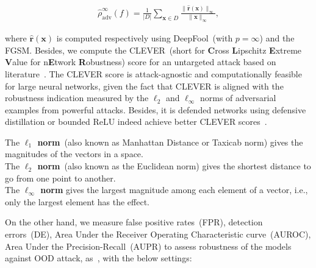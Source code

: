 \vspace{-4mm}
\begin{align}
    \hat{\rho}_{\mathrm{adv}}^{\infty}(f)=\frac{1}{|D|} \sum_{\boldsymbol{x} \in D} \frac{\|\hat{\boldsymbol{r}}(\boldsymbol{x})\|
    _{\infty}}{\|\boldsymbol{x}\|_{\infty}},
\end{align}

where $\hat{\boldsymbol{r}}(\boldsymbol{x})$ is
computed respectively using DeepFool~(with $p=\infty$) and the FGSM. Besides, we compute the CLEVER~(short for \textbf{C}ross \textbf{L}ipschitz \textbf{E}xtreme \textbf{V}alue for n\textbf{E}twork \textbf{R}obustness) score for an untargeted attack based on literature~\cite{weng2018evaluating}. 
The CLEVER score is attack-agnostic and computationally feasible for large neural networks, given the fact that CLEVER is aligned with the robustness indication measured by the $\ell_{2}$ and $\ell_{\infty}$ norms of adversarial examples from powerful attacks. 
Besides, it is defended networks using defensive distillation or bounded ReLU indeed achieve better CLEVER scores~\cite{weng2018evaluating}. 

\vspace{2mm}
\begin{tcolorbox}[colback=white!3!white,colframe=gray!120!black,title=\faBook~$\ell_{2}$ vs. $\ell_{2}$ vs. $\ell_{\infty}$ norms]
    \scriptsize{
        The \textbf{$\ell_{1}$ norm}~(also known as Manhattan Distance or Taxicab norm) gives the magnitudes of the vectors in a space. \\
        The \textbf{$\ell_{2}$ norm}~(also known as the Euclidean norm) gives the shortest distance to go from one point to another. \\
        The \textbf{$\ell_{\infty}$ norm} gives the largest magnitude among each element of a vector, i.e., only the largest element has the effect. 
        }
\end{tcolorbox}

\hspace*{3.5mm} On the other hand, we measure false positive rates~(FPR), detection errors~(DE), Area Under the Receiver Operating Characteristic curve~(AUROC), Area Under the Precision-Recall~(AUPR) to assess robustness of the models against OOD attack, as~\cite{OOD19,OOD18}, with the below settings: 

